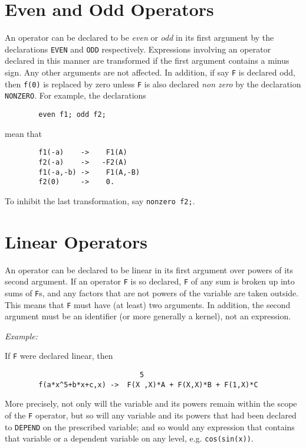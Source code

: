 \section{Even and Odd Operators}
\hypertarget{command:EVEN}{}
\hypertarget{command:ODD}{}
\hypertarget{command:NONZERO}{}
An operator can be declared to be \emph{even} or \emph{odd} in its first
argument by the declarations \texttt{EVEN} and
\texttt{ODD} respectively.  Expressions involving an operator
declared in this manner are transformed if the first argument contains a
minus sign.  Any other arguments are not affected.  In addition, if say
\texttt{F} is declared odd, then \texttt{f(0)} is replaced by zero unless
\texttt{F} is also declared \emph{non zero} by the declaration
\texttt{NONZERO}.  For example, the declarations
\begin{verbatim}
        even f1; odd f2;
\end{verbatim}
mean that
\begin{verbatim}
        f1(-a)    ->    F1(A)
        f2(-a)    ->   -F2(A)
        f1(-a,-b) ->    F1(A,-B)
        f2(0)     ->    0.
\end{verbatim}
To inhibit the last transformation, say \texttt{nonzero f2;}.

\section{Linear Operators}
\hypertarget{command:LINEAR}{}
An operator can be declared to be linear in its first argument over powers
of its second argument.  If an operator \texttt{F} is so declared, \texttt{F} of
any sum is broken up into sums of \texttt{F}s, and any factors that are not
powers of the variable are taken outside.  This means that \texttt{F} must
have (at least) two arguments.  In addition, the second argument must be
an identifier (or more generally a kernel), not an expression.

\textit{Example:}

If \texttt{F} were declared linear, then
\begin{verbatim}
                                5
        f(a*x^5+b*x+c,x) ->  F(X ,X)*A + F(X,X)*B + F(1,X)*C
\end{verbatim}
More precisely, not only will the variable and its powers remain within the
scope of the \texttt{F} operator, but so will any variable and its powers that
had been declared to \texttt{DEPEND} on the prescribed variable; and so would
any expression that contains that variable or a dependent variable on any
level, e.g. \texttt{cos(sin(x))}.

